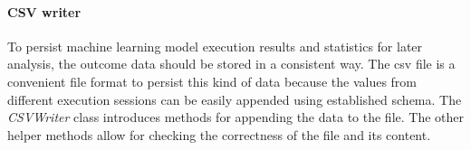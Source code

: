 \paragraph{CSV writer}\label{para:csv-writer}
To persist machine learning model execution results and statistics for later analysis, the outcome data should be stored in a consistent way.
The \gls{csv} file is a convenient file format to persist this kind of data because the values from different execution sessions can be easily appended using established schema.
The \textit{CSVWriter} class introduces methods for appending the data to the file.
The other helper methods allow for checking the correctness of the file and its content.

